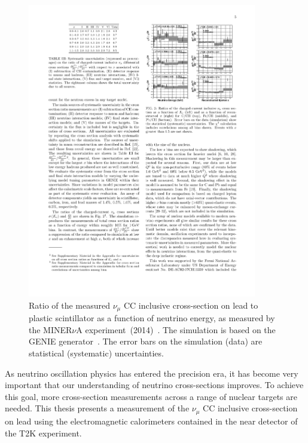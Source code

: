 \begin{figure}%
  \centering
  \includegraphics[width=10cm]{images/neutrino_interactions/MINERvA_XSec.pdf}
  \caption{Ratio of the measured $\nu_\mu$ CC inclusive cross-section on lead to plastic scintillator as a function of neutrino energy, as measured by the MINER$\nu$A experiment~(2014)~\cite{PhysRevLett.112.231801}.  The simulation is based on the GENIE generator~\cite{Andreopoulos201087}.  The error bars on the simulation (data) are statistical (systematic) uncertainties.}
  \label{fig:MINERvAXSec}
\end{figure}
\newline
\newline
As neutrino oscillation physics has entered the precision era, it has become very important that our understanding of neutrino cross-sections improves.  To achieve this goal, more cross-section measurements across a range of nuclear targets are needed.  This thesis presents a measurement of the $\nu_\mu$ CC inclusive cross-section on lead using the electromagnetic calorimeters contained in the near detector of the T2K experiment.  

